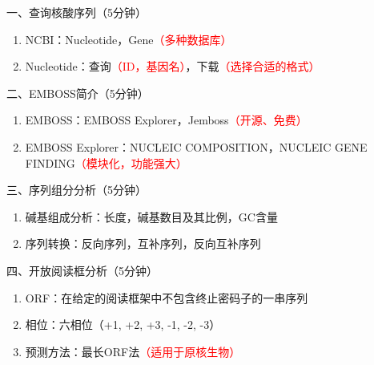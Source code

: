 \documentclass{TIJMUjiaoanSY}
\begin{document}


\firstTail


\newpage
\otherHeader

\noindent
一、查询核酸序列（5分钟）
\begin{enumerate}
  \item NCBI：Nucleotide，Gene\textcolor{red}{（多种数据库）}
  \item Nucleotide：查询\textcolor{red}{（ID，基因名）}，下载\textcolor{red}{（选择合适的格式）}
\end{enumerate}

\noindent
二、EMBOSS简介（5分钟）
\begin{enumerate}
  \item EMBOSS：EMBOSS Explorer，Jemboss\textcolor{red}{（开源、免费）}
  \item EMBOSS Explorer：NUCLEIC COMPOSITION，NUCLEIC GENE FINDING\textcolor{red}{（模块化，功能强大）}
\end{enumerate}

\noindent
三、序列组分分析（5分钟）
\begin{enumerate}
  \item 碱基组成分析：长度，碱基数目及其比例，GC含量
  \item 序列转换：反向序列，互补序列，反向互补序列
\end{enumerate}

\noindent
四、开放阅读框分析（5分钟）
\begin{enumerate}
  \item ORF：在给定的阅读框架中不包含终止密码子的一串序列
  \item 相位：六相位（+1, +2, +3, -1, -2, -3）
  \item 预测方法：最长ORF法\textcolor{red}{（适用于原核生物）}
\end{enumerate}
\end{document}

